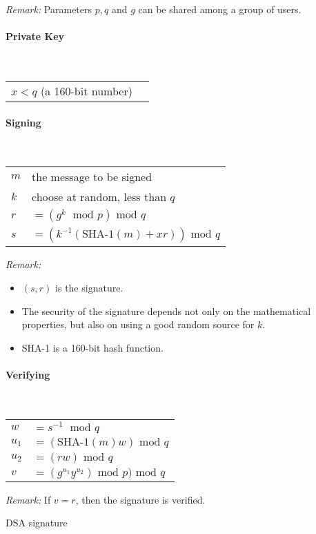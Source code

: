 \begin{bibunit}[babalpha]
\begin{cryptoprocedure}
\emph{Remark:} Parameters $p,q$ and $g$ can be shared among a group of users.

\paragraph*{Private Key}\strut\\
\begin{tabular}{l@{ }l}
$x < q$ (a 160-bit number) 
\end{tabular}

\paragraph*{Signing}\strut\\
\begin{tabular}{l@{ }l}
$m$ & the message to be signed\\
$k$ & choose at random\index{random}, less than $q$\\
$r$ & $= (g^k \; \mbox{ mod } p) \mbox{ mod } q$\\
$s$ & $= (k^{-1}(\mbox{SHA-1}(m) + xr)) \mbox{ mod } q$
\end{tabular}

\emph{Remark:}
\begin{itemize}
\item $(s,r)$ is the signature.
\item The security of the signature depends not only on the mathematical
  properties, but also on using a good random source  for $k$.
\item SHA-1  is a 160-bit hash function.
\end{itemize}
\paragraph*{Verifying}\strut\\
\begin{tabular}{l@{ }l}
$w$ & $= s^{-1} \;  \mbox{ mod } q$\\
$u_1$ & $= (\mbox{SHA-1}(m)w) \mbox{ mod } q$\\
$u_2$ & $= (rw)  \mbox{ mod } q$\\
$v$ & $= (g^{u_1}y^{u_2}) \mbox{ mod } p)  \mbox{ mod } q$\\

\end{tabular}

\emph{Remark:} If $v = r$, then the signature is verified.
\caption{DSA signature}
\label{dsasigproc}
\end{cryptoprocedure}


\end{bibunit}
